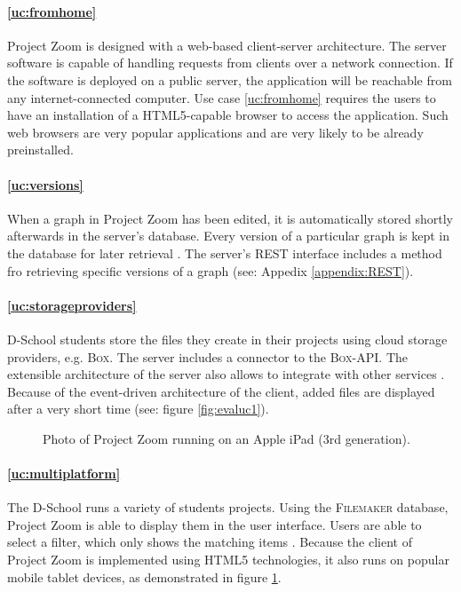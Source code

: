 \paragraph{\ref{uc:fromhome}} Project Zoom is designed with a web-based client-server architecture. The server software is capable of handling requests from clients over a network connection. If the software is deployed on a public server, the application will be reachable from any internet-connected computer. Use case \ref{uc:fromhome} requires the users to have an installation of a HTML5-capable browser to access the application. Such web browsers are very popular applications and are very likely to be already preinstalled.

\paragraph{\ref{uc:versions}} When a graph in Project Zoom has been edited, it is automatically stored shortly afterwards in the server's database. Every version of a particular graph is kept in the database for later retrieval \cite{Bocklisch_2013}. The server's REST interface includes a method fro retrieving specific versions of a graph (see: Appedix \ref{appendix:REST}).

\paragraph{\ref{uc:storageproviders}} D-School students store the files they create in their projects using cloud storage providers, e.g. \textsc{Box}. The server includes a connector to the \textsc{Box}-API. The extensible architecture of the server also allows to integrate with other services \cite{Werkmeister_2013}. Because of the event-driven architecture of the client, added files are displayed after a very short time (see: figure \ref{fig:evaluc1}).

\begin{figure}
\begin{center}
\caption{Photo of Project Zoom running on an Apple iPad (3rd generation).}
\label{fig:evaluc6}
\end{center}
\end{figure}

\paragraph{\ref{uc:multiplatform}} The D-School runs a variety of students projects. Using the \textsc{Filemaker} database, Project Zoom is able to display them in the user interface. Users are able to select a filter, which only shows the matching items \cite{Dieckhoff_2013}. Because the client of Project Zoom is implemented using HTML5 technologies, it also runs on popular mobile tablet devices, as demonstrated in figure \ref{fig:evaluc6}.

